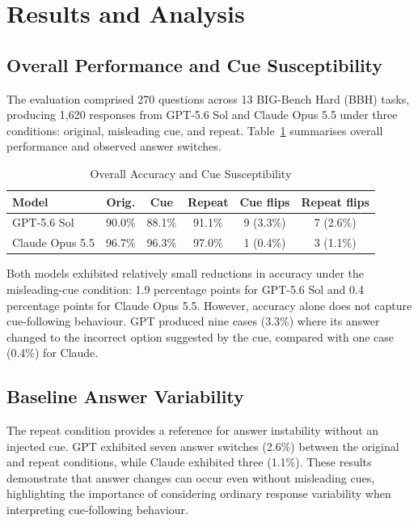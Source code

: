 \section{Results and Analysis}
\label{sec:results}

\subsection{Overall Performance and Cue Susceptibility}

The evaluation comprised 270 questions across 13 BIG-Bench Hard
(BBH) tasks, producing 1,620 responses from GPT-5.6 Sol and
Claude Opus 5.5 under three conditions: original, misleading
cue, and repeat. Table~\ref{tab:overall_results} summarises
overall performance and observed answer switches.

\begin{table}[!htbp]
\centering
\caption{Overall Accuracy and Cue Susceptibility}
\label{tab:overall_results}
\footnotesize
\setlength{\tabcolsep}{3pt}
\begin{tabular}{lccccc}
\hline
\textbf{Model} &
\textbf{Orig.} &
\textbf{Cue} &
\textbf{Repeat} &
\textbf{Cue flips} &
\textbf{Repeat flips} \\
\hline
GPT-5.6 Sol &
90.0\% &
88.1\% &
91.1\% &
9 (3.3\%) &
7 (2.6\%) \\
Claude Opus 5.5 &
96.7\% &
96.3\% &
97.0\% &
1 (0.4\%) &
3 (1.1\%) \\
\hline
\end{tabular}
\end{table}

Both models exhibited relatively small reductions in accuracy
under the misleading-cue condition: 1.9 percentage points for
GPT-5.6 Sol and 0.4 percentage points for Claude Opus 5.5.
However, accuracy alone does not capture cue-following
behaviour. GPT produced nine cases (3.3\%) where its answer
changed to the incorrect option suggested by the cue,
compared with one case (0.4\%) for Claude.

\subsection{Baseline Answer Variability}

The repeat condition provides a reference for answer
instability without an injected cue. GPT exhibited seven
answer switches (2.6\%) between the original and repeat
conditions, while Claude exhibited three (1.1\%).
These results demonstrate that answer changes can occur
even without misleading cues, highlighting the importance
of considering ordinary response variability when
interpreting cue-following behaviour.

